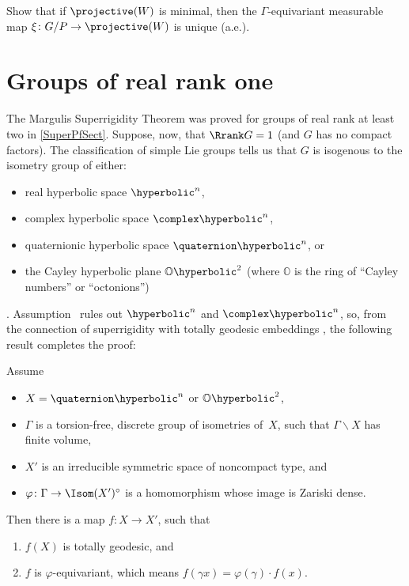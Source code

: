 \begin{exercises}
\item
Show that if $\projective(W)$ is minimal, then the $\Gamma$-equivariant measurable map $\xi \colon G/P \to \projective(W)$ is unique (a.e.).

\end{exercises}




\section{Groups of real rank one} \label{SuperRank1Sect}

The Margulis Superrigidity Theorem  was proved for groups of real rank at least two in \cref{SuperPfSect}. Suppose, now, that $\Rrank G = 1$ (and $G$ has no compact factors). The classification of simple Lie groups tells us that $G$ is isogenous to the isometry group of either:
	\begin{itemize}
	\item real hyperbolic space $\hyperbolic^n$,
	\item complex hyperbolic space $\complex\hyperbolic^n$,
	\item quaternionic hyperbolic space $\quaternion\hyperbolic^n$,
	or
	\item the Cayley hyperbolic plane $\mathbb{O}\hyperbolic^2$ (where $\mathbb{O}$ is the ring of ``Cayley numbers'' or ``octonions'')
	\end{itemize}
 .
Assumption~ rules out $\hyperbolic^n$ and $\complex\hyperbolic^n$, so, from the connection of superrigidity with totally geodesic embeddings , the following result completes the proof:

\begin{thm}
Assume
	\begin{itemize}
	\item $X = \quaternion\hyperbolic^n$ or\/ $\mathbb{O}\hyperbolic^2$,
	\item $\Gamma$ is a torsion-free, discrete group of isometries of~$X$, such that\/ $\Gamma \backslash X$ has finite volume,
	\item $X'$ is an irreducible symmetric space of noncompact type,
	and
	\item $\varphi \colon \Gamma \to \Isom(X')^\circ$ is  a homomorphism whose image is Zariski dense.
	\end{itemize}
Then there is a map $f \colon X \to X'$, such that 
	\begin{enumerate}
	\item $f(X)$ is totally geodesic,
	and
	\item $f$ is $\varphi$-equivariant, which means $f(\gamma x) = \varphi(\gamma) \cdot f(x)$.
	\end{enumerate}
\end{thm}

